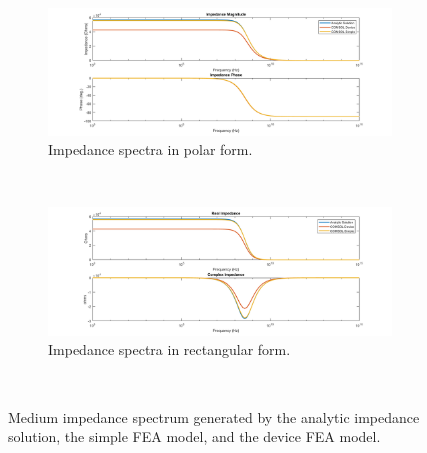 \begin{figure}[h]
    \centering
    \begin{subfigure}[b]{\textwidth}
        \centering
        \includegraphics[width=\textwidth]{images/IS_model_medium_mag_phase.png}
        \caption{Impedance spectra in polar form.}
    \end{subfigure}
    \\
    \vspace{0.1 in}
    \begin{subfigure}[b]{\textwidth}
        \centering
        \includegraphics[width=\textwidth]{images/IS_model_medium_real_imag.png}
        \caption{Impedance spectra in rectangular form.}
    \end{subfigure}
    \\
    \vspace{0.1 in}
    \caption[Analyitic and FEA generated medium impedance spectrum]{Medium impedance spectrum generated by the analytic impedance solution, the simple FEA model, and the device FEA model.}
    \label{fig:medium_model_IS_data}
\end{figure}


